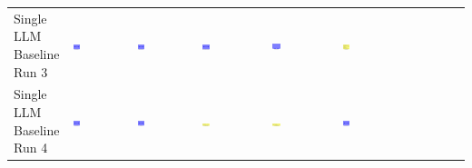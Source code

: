 \begin{table}
\begin{tabular}{@{}mmmmmm@{}}
    \makecell{Single LLM \\ Baseline \\ Run 3} & \includegraphics[width=0.13\textwidth]{./run_3/png/gpt-4o_results/MicrofluidicChip.png} & \includegraphics[width=0.13\textwidth]{./run_3/png/o1-preview_results/MicrofluidicChip.png} & \includegraphics[width=0.13\textwidth]{./run_3/png/claude-3-5-sonnet-20240620_results/MicrofluidicChip.png} & \includegraphics[width=0.13\textwidth]{./run_3/png/watsonx_meta-llama_llama-3-1-70b-instruct_results/MicrofluidicChip.png} & \includegraphics[width=0.13\textwidth]{./run_3/png/watsonx_meta-llama_llama-3-405b-instruct_results/MicrofluidicChip.png} \\
    \makecell{Single LLM \\ Baseline \\ Run 4} & \includegraphics[width=0.13\textwidth]{./run_4/png/gpt-4o_results/MicrofluidicChip.png} & \includegraphics[width=0.13\textwidth]{./run_4/png/o1-preview_results/MicrofluidicChip.png} & \includegraphics[width=0.13\textwidth]{./run_4/png/claude-3-5-sonnet-20240620_results/MicrofluidicChip.png} & \includegraphics[width=0.13\textwidth]{./run_4/png/watsonx_meta-llama_llama-3-1-70b-instruct_results/MicrofluidicChip.png} & \includegraphics[width=0.13\textwidth]{./run_4/png/watsonx_meta-llama_llama-3-405b-instruct_results/MicrofluidicChip.png} \\

\end{tabular}
\end{table}
